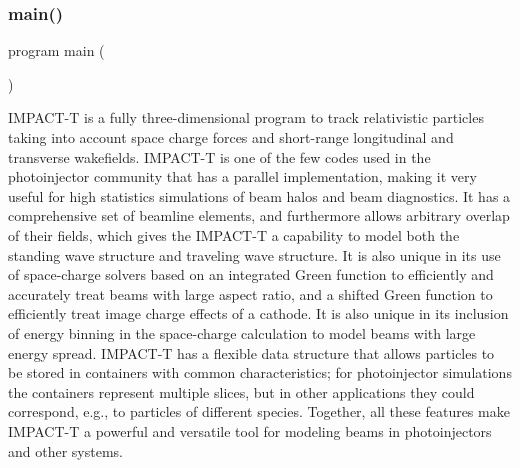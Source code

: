 \subsubsection{\texorpdfstring{main()}{main()}}
{\footnotesize\ttfamily program main (\begin{DoxyParamCaption}{ }\end{DoxyParamCaption})}



I\+M\+P\+A\+C\+T-\/T is a fully three-\/dimensional program to track relativistic particles taking into account space charge forces and short-\/range longitudinal and transverse wakefields. I\+M\+P\+A\+C\+T-\/T is one of the few codes used in the photoinjector community that has a parallel implementation, making it very useful for high statistics simulations of beam halos and beam diagnostics. It has a comprehensive set of beamline elements, and furthermore allows arbitrary overlap of their fields, which gives the I\+M\+P\+A\+C\+T-\/T a capability to model both the standing wave structure and traveling wave structure. It is also unique in its use of space-\/charge solvers based on an integrated Green function to efficiently and accurately treat beams with large aspect ratio, and a shifted Green function to efficiently treat image charge effects of a cathode. It is also unique in its inclusion of energy binning in the space-\/charge calculation to model beams with large energy spread. I\+M\+P\+A\+C\+T-\/T has a flexible data structure that allows particles to be stored in containers with common characteristics; for photoinjector simulations the containers represent multiple slices, but in other applications they could correspond, e.\+g., to particles of different species. Together, all these features make I\+M\+P\+A\+C\+T-\/T a powerful and versatile tool for modeling beams in photoinjectors and other systems. 

